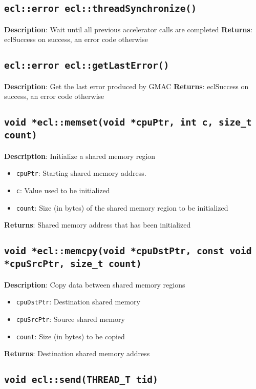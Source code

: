 \subsection{\texttt{ecl::error ecl::threadSynchronize()}}

\textbf{Description}: Wait until all previous accelerator calls are completed
\textbf{Returns}: eclSuccess on success, an error code otherwise

\subsection{\texttt{ecl::error ecl::getLastError()}}

\textbf{Description}: Get the last error produced by GMAC
\textbf{Returns}: eclSuccess on success, an error code otherwise

\subsection{\texttt{void *ecl::memset(void *cpuPtr, int c, size\_t count)}}

\textbf{Description}: Initialize a shared memory region
\begin{itemize}
  \item \texttt{cpuPtr}: Starting shared memory address.
  \item \texttt{c}: Value used to be initialized
  \item \texttt{count}: Size (in bytes) of the shared memory region to be initialized
\end{itemize}
\textbf{Returns}: Shared memory address that has been initialized

\subsection{\texttt{void *ecl::memcpy(void *cpuDstPtr, const void *cpuSrcPtr, size\_t count)}}

\textbf{Description}: Copy data between shared memory regions
\begin{itemize}
  \item \texttt{cpuDstPtr}: Destination shared memory
  \item \texttt{cpuSrcPtr}: Source shared memory
  \item \texttt{count}: Size (in bytes) to be copied
\end{itemize}
\textbf{Returns}: Destination shared memory address

\subsection{\texttt{void ecl::send(THREAD\_T tid)}}

